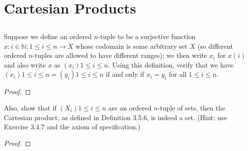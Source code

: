 \documentclass[../../main.tex]{subfiles}
\begin{document}
\ifmainfile
\else
    \ifchapfile
    \else
        \addtocounter{chapter}{3}
        \addtocounter{section}{4}
        \makeatletter
        \begin{flushright}
            \@title \\
            \@author \\
            \@date
        \end{flushright}
    \fi
\fi

\section{Cartesian Products}

\addtocounter{subsection}{1}
\subsection{}
\begin{q}
    Suppose we define an ordered $n$-tuple to be a surjective function $x : {i \in \mathbb{N} : 1 \leq i \leq n} \to X$ whose codomain is some arbitrary set $X$ (so different ordered $n$-tuples are allowed to have different ranges); we then write $x_i$ for $x(i)$ and also write $x$ as $(x_i){1 \leq i \leq n}$. Using this definition, verify that we have $(x_i){1 \leq i \leq n} = (y_i){1 \leq i \leq n}$ if and only if $x_i = y_i$ for all $1 \leq i \leq n$. 
\end{q}

\begin{proof}

\end{proof}
\begin{xx}
    
\end{xx}

\begin{q}
    Also, show that if $(X_i){1 \leq i \leq n}$ are an ordered $n$-tuple of sets, then the Cartesian product, as defined in Definition 3.5.6, is indeed a set. (Hint: use Exercise 3.4.7 and the axiom of specification.)
\end{q}

\begin{proof}

\end{proof}
\begin{xx}
    
\end{xx}

\addtocounter{subsection}{1}
\end{document}

